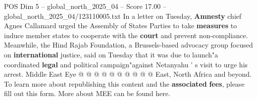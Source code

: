 \begin{textsample}{POS Dim 5 – global\_north\_2025\_04 – Score 17.00 – global\_north\_2025\_04/123110005.txt}
In a letter on Tuesday, \textbf{Amnesty} chief Agnes Callamard urged the Assembly of States Parties to take \textbf{measures} to induce member states to cooperate with the \textbf{court} and prevent non-compliance.
Meanwhile, the Hind Rajab Foundation, a Brussels-based advocacy group focused on \textbf{international} justice, said on Tuesday that it was due to launch"a coordinated \textbf{legal} and political campaign"against Netanyahu ' s visit to urge his arrest.
Middle East Eye @ @ @ @ @ @ @ @ @ @ East, North Africa and beyond.
To learn more about republishing this content and the \textbf{associated} \textbf{fees}, please fill out this form.
More about MEE can be found here.

\end{textsample}
